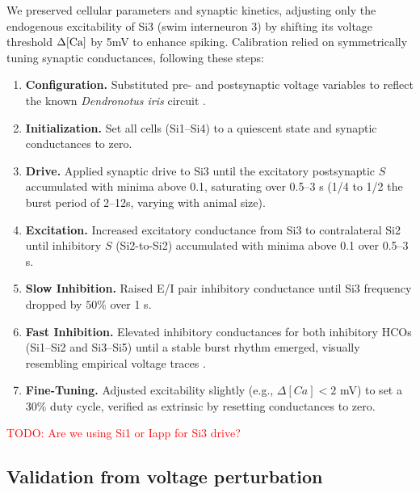 \documentclass[nofootinbib,aip,amsmath,amssymb,reprint,twocolumn,10pt]{revtex4-2}
\begin{document}
We preserved cellular parameters and synaptic kinetics, adjusting only the endogenous excitability of Si3 (swim interneuron 3) by shifting its voltage threshold $\Delta [\rm Ca]$ by 5mV to enhance spiking.
Calibration relied on symmetrically tuning synaptic conductances, following these steps:\\
%
\begin{enumerate}
    \item \textbf{Configuration.} Substituted pre- and postsynaptic voltage variables to reflect the known \textit{Dendronotus iris} circuit \cite{SakuraiKatz2016}.
    \item \textbf{Initialization.} Set all cells (Si1--Si4) to a quiescent state and synaptic conductances to zero.
    \item \textbf{Drive.} Applied synaptic drive to Si3 until the excitatory postsynaptic $S$
    accumulated with minima above 0.1, saturating over 0.5--3 s (1/4 to 1/2 the burst period
     of 2--12s, varying with animal size).
    \item \textbf{Excitation.} Increased excitatory conductance from Si3 to contralateral Si2 until inhibitory $S$ (Si2-to-Si2) accumulated with minima above 0.1 over 0.5--3 s.
    \item \textbf{Slow Inhibition.} Raised E/I pair inhibitory conductance until Si3 frequency dropped by $50\%$ over 1 s.
    \item \textbf{Fast Inhibition.} Elevated inhibitory conductances for both inhibitory HCOs (Si1--Si2 and Si3--Si5) until a stable burst rhythm emerged, visually resembling empirical voltage traces \cite{SakuraiKatz2016}.
    \item \textbf{Fine-Tuning.} Adjusted excitability slightly (e.g., $\Delta [Ca] < 2$ mV) to set a 30\% duty cycle, verified as extrinsic by resetting conductances to zero.
\end{enumerate}

\textcolor{red}{TODO: Are we using Si1 or Iapp for Si3 drive?}

\subsection{Validation from voltage perturbation}


\label{fig:supp} 
\end{document}
